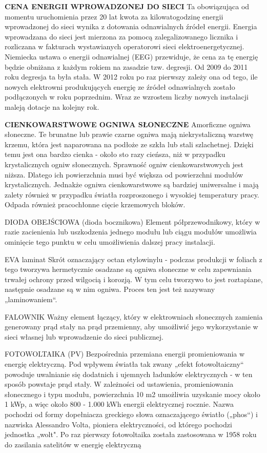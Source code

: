 \documentclass[12pt,a4paper]{article}
\begin{document}
\textbf{CENA ENERGII WPROWADZONEJ DO SIECI}
Ta obowiązująca od momentu uruchomienia przez 20 lat kwota za kilowatogodzinę energii wprowadzonej do sieci wynika z dotowania odnawialnych źródeł energii. Energia wprowadzana do sieci jest mierzona za pomocą zalegalizowanego licznika i rozliczana w fakturach wystawianych operatorowi sieci elektroenergetycznej. Niemiecka ustawa o energii odnawialnej (EEG) przewiduje, że cena za tę energię będzie obniżana z każdym rokiem na zasadzie tzw. degresji. Od 2009 do 2011 roku degresja ta była stała. W 2012 roku po raz pierwszy zależy ona od tego, ile nowych elektrowni produkujących energię ze źródeł odnawialnych zostało podłączonych w roku poprzednim. Wraz ze wzrostem liczby nowych instalacji maleją dotacje na kolejny rok.


\textbf{CIENKOWARSTWOWE OGNIWA SŁONECZNE}
Amorficzne ogniwa słoneczne. Te brunatne lub prawie czarne ogniwa mają niekrystaliczną warstwę krzemu, która jest naparowana na podłoże ze szkła lub stali szlachetnej. Dzięki temu jest ona bardzo cienka - około sto razy cieńsza, niż w przypadku krystalicznych ogniw słonecznych. Sprawność ogniw cienkowarstwowych jest niższa. Dlatego ich powierzchnia musi być większa od powierzchni modułów krystalicznych. Jednakże ogniwa cienkowarstwowe są bardziej uniwersalne i mają zalety również w przypadku światła rozproszonego i wysokiej temperatury pracy. Odpada również pracochłonne cięcie krzemowych bloków.


DIODA OBEJŚCIOWA (dioda bocznikowa)
Element półprzewodnikowy, który w razie zacienienia lub uszkodzenia jednego modułu lub ciągu modułów umożliwia ominięcie tego punktu w celu umożliwienia dalszej pracy instalacji.

EVA laminat
Skrót oznaczający octan etylowinylu - podczas produkcji w foliach z tego tworzywa hermetycznie osadzane są ogniwa słoneczne w celu zapewniania trwałej ochrony przed wilgocią i korozją. W tym celu tworzywo to jest roztapiane, następnie osadzane są w nim ogniwa. Proces ten jest też nazywany „laminowaniem“.


FALOWNIK
Ważny element łączący, który w elektrowniach słonecznych zamienia generowany prąd stały na prąd przemienny, aby umożliwić jego wykorzystanie w sieci własnej lub wprowadzenie do sieci publicznej.


FOTOWOLTAIKA (PV)
Bezpośrednia przemiana energii promieniowania w energię elektryczną. Pod wpływem światła tak zwany „efekt fotowoltaiczny“ powoduje uwalnianie się dodatnich i ujemnych ładunków elektrycznych - w ten sposób powstaje prąd stały. W zależności od ustawienia, promieniowania słonecznego i typu modułu, powierzchnia 10 m2 umożliwia uzyskanie mocy około 1 kWp, a więc około 800 - 1.000 kWh energii elektrycznej rocznie. Nazwa pochodzi od formy dopełniacza greckiego słowa oznaczającego światło („phos“) i nazwiska Alessandro Volta, pioniera elektryczności, od którego pochodzi jednostka „wolt". Po raz pierwszy fotowoltaika została zastosowana w 1958 roku do zasilania satelitów w energię elektryczną
\end{document}
